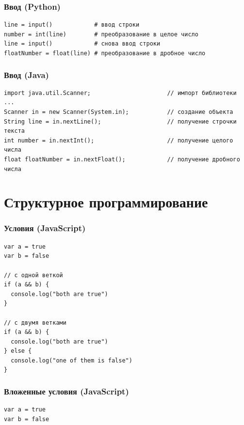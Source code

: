 {\begin{frame}[fragile]
  \frametitle{Ввод (Python)}
  \begin{verbatim}
line = input()            # ввод строки
number = int(line)        # преобразование в целое число
line = input()            # снова ввод строки
floatNumber = float(line) # преобразование в дробное число
  \end{verbatim}
\end{frame}

\begin{frame}[fragile]
  \frametitle{Ввод (Java)}
  \begin{verbatim}
import java.util.Scanner;                      // импорт библиотеки
...
Scanner in = new Scanner(System.in);           // создание объекта
String line = in.nextLine();                   // получение строчки текста
int number = in.nextInt();                     // получение целого числа
float floatNumber = in.nextFloat();            // получение дробного числа
  \end{verbatim}
\end{frame}



\section{Структурное программирование}
\begin{frame}[fragile]
\frametitle{Условия (JavaScript)}
  \begin{verbatim}
var a = true
var b = false

// с одной веткой
if (a && b) {
  console.log("both are true")
}

// с двумя ветками
if (a && b) {
  console.log("both are true")
} else {
  console.log("one of them is false")
}
  \end{verbatim}
\end{frame}

\begin{frame}[fragile]
\frametitle{Вложенные условия (JavaScript)}
  \begin{verbatim}
var a = true
var b = false


\end{verbatim}
\end{frame}}
